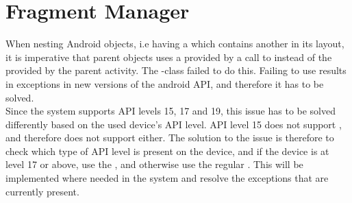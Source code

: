\section{Fragment Manager}
\label{sec:fragment_manager}

When nesting Android  objects, i.e having a  which contains another  in its layout, it is imperative that parent  objects uses a  provided by a call to  instead of the  provided by the parent activity. The \giraf-class  failed to do this. Failing to use  results in exceptions in new versions of the android API, and therefore it has to be solved. \\

Since the \giraf system supports API levels 15, 17 and 19, this issue has to be solved differently based on the used device's API level. API level 15 does not support , and therefore does not support  either. The solution to the issue is therefore to check which type of API level is present on the device, and if the device is at level 17 or above, use the , and otherwise use the regular . This will be implemented where needed in the \giraf system and resolve the exceptions that are currently present. 